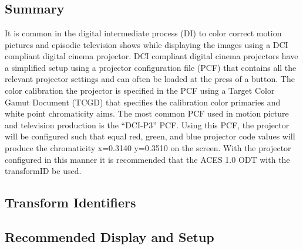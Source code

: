 \section[P3-DCI]{\shortName{}}
\label{sec:odt-details-\id}

\subsection{Summary}
\label{subsec:summary-\id}

It is common in the digital intermediate process (DI) to color correct motion pictures and episodic television shows while displaying the images using a DCI compliant digital cinema projector. DCI compliant digital cinema projectors have a simplified setup using a projector configuration file (PCF) that contains all the relevant projector settings and can often be loaded at the press of a button. The color calibration the projector is specified in the PCF using a Target Color Gamut Document (TCGD) that specifies the calibration color primaries and white point chromaticity aims.  The most common PCF used in motion picture and television production is the ``DCI-P3'' PCF. Using this PCF, the projector will be configured such that equal red, green, and blue projector code values will produce the chromaticity x=0.3140 y=0.3510 on the screen. With the projector configured in this manner it is recommended that the ACES 1.0 ODT with the transformID \transformID{} be used.

\subsection{Transform Identifiers} 
\label{subsec:odt-ident-\id}

\subsection{Recommended Display and Setup}
\label{subsec:setup-\id}

